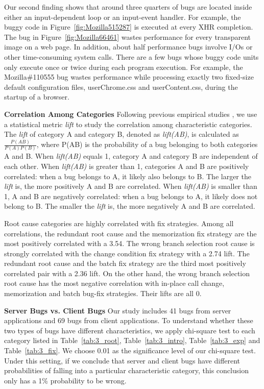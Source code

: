 Our second finding shows that
around three quarters of bugs are
located inside either an input-dependent loop or an input-event handler. 
For example, the buggy code in Figure~\ref{fig:Mozilla515287}
is executed at every XHR completion.
The bug in Figure~\ref{fig:Mozilla66461} wastes performance
for every transparent image on a web page.
In addition, about half performance bugs involve I/Os or 
other time-consuming system calls. 
There are a few bugs whose buggy code units only execute once or twice
during each program execution. For example, the Mozilla\#110555 bug wastes
performance while processing exactly two fixed-size
default configuration files,
userChrome.css and userContent.css, during the startup of a browser.

{\bf Correlation Among Categories}
Following previous empirical studies \citep{LiASID06}, we use a statistical 
metric {\it lift} to study the correlation among characteristic categories.
The {\it lift} of category A and category B, denoted as {\it lift(AB)}, 
    is calculated 
as $\frac{P(AB)}{P(A)P(B)}$, where P(AB) is the probability of a bug belonging 
to both categories A and B. When {\it lift(AB)} equals 1,   
category A and category B are independent of each other.
When {\it lift(AB)} is greater than 1, categories A and B are 
positively correlated: when a bug belongs to A, it likely
also belongs to B. The larger the {\it lift} is, the more positively A and B
are correlated.
When {\it lift(AB)} is smaller than 1, A and B are negatively
correlated: when a bug belongs to A, it likely does not belong to B.
The smaller the {\it lift} is, the more negatively A and B are correlated.

Root cause categories are highly correlated with fix strategies. 
Among all correlations, the redundant root cause and the memorization fix strategy are 
the most positively correlated with a 3.54. 
The wrong branch selection root cause is strongly correlated with the change condition 
fix strategy with a 2.74 lift. The redundant root cause and the batch fix strategy are the third 
most positively correlated pair with a 2.36 lift. 
On the other hand, the wrong branch selection root cause has the most negative correlation 
with in-place call change, memorization and batch bug-fix strategies. 
Their lifts are all 0. 



{\bf Server Bugs vs. Client Bugs}
Our study includes 41 bugs from server applications and 69 bugs from client 
applications. To understand whether these two types of bugs have different 
characteristics, we apply chi-square test
\citep{chisquared} to each
category listed in Table~\ref{tab:3_root}, Table~\ref{tab:3_intro}, Table~\ref{tab:3_exp} and Table~\ref{tab:3_fix}.
We choose 0.01 as the significance level of our chi-square test. 
Under this setting, if we conclude that server and client bugs have different
probabilities of falling into a particular characteristic category, 
this conclusion only has a 1\% probability to be wrong. 

